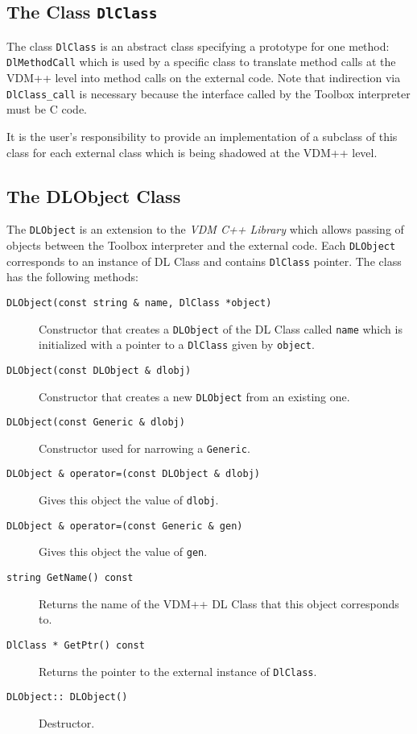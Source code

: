 \documentclass[\pformat,12pt]{article}
\newcommand{\vdmcpplib}{\textit{VDM C++ Library}}
\begin{document}
\subsection{The Class \texttt{DlClass}}
The class \texttt{DlClass} is an abstract class specifying a prototype
for one method: \texttt{DlMethodCall} which is used by a specific
class to translate method calls at the VDM++ level into method calls
on the external code. Note that indirection via \texttt{DlClass\_call}
is necessary because the interface called by the Toolbox interpreter
must be C code.

It is the user's responsibility to provide an implementation of a
subclass of this class for each external class which is being shadowed
at the VDM++ level.

\subsection{The DLObject Class}
The \texttt{DLObject} is an extension to the {\vdmcpplib} which allows
passing 
of objects between the Toolbox interpreter and the external code. Each
\texttt{DLObject} corresponds to an instance of DL Class and contains
\texttt{DlClass} pointer. The class has the following methods:
\begin{description}
\item[\texttt{DLObject(const string \& name, DlClass *object)}]
Constructor that creates a \texttt{DLObject} of the DL Class
called \texttt{name} which is initialized with a pointer to a
\texttt{DlClass} given by \texttt{object}.
\item[\texttt{DLObject(const DLObject \& dlobj)}]
Constructor that creates a new \texttt{DLObject} from an existing
one.
\item[\texttt{DLObject(const Generic \& dlobj)}]
Constructor used for narrowing a \texttt{Generic}.
\item[\texttt{DLObject \& operator=(const DLObject  \& dlobj)}]
Gives this object the value of \texttt{dlobj}.
\item[\texttt{DLObject \& operator=(const Generic \& gen)}]
Gives this object the value of \texttt{gen}.
\item[\texttt{string GetName() const}]
Returns the name of the VDM++ DL Class that this object corresponds to.
\item[\texttt{DlClass * GetPtr() const}]
Returns the pointer to the external instance of \texttt{DlClass}. 
\item[\texttt{DLObject::~DLObject()}]
Destructor.
\end{description}
\end{document}
